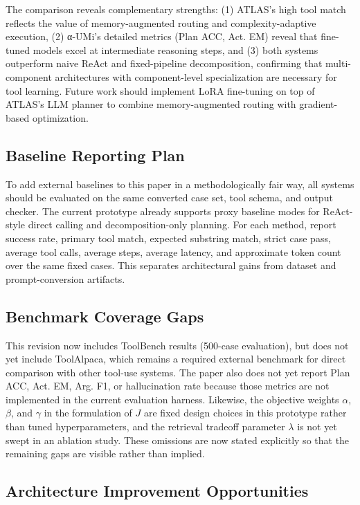 \documentclass[conference]{IEEEtran}
\begin{document}
The comparison reveals complementary strengths: (1) ATLAS's high tool match reflects the value of memory-augmented routing and complexity-adaptive execution, (2) α-UMi's detailed metrics (Plan ACC, Act. EM) reveal that fine-tuned models excel at intermediate reasoning steps, and (3) both systems outperform naive ReAct and fixed-pipeline decomposition, confirming that multi-component architectures with component-level specialization are necessary for tool learning. Future work should implement LoRA fine-tuning on top of ATLAS's LLM planner to combine memory-augmented routing with gradient-based optimization.

\subsection{Baseline Reporting Plan}

To add external baselines to this paper in a methodologically fair way, all systems should be evaluated on the same converted case set, tool schema, and output checker. The current prototype already supports proxy baseline modes for ReAct-style direct calling and decomposition-only planning. For each method, report success rate, primary tool match, expected substring match, strict case pass, average tool calls, average steps, average latency, and approximate token count over the same fixed cases. This separates architectural gains from dataset and prompt-conversion artifacts.

\subsection{Benchmark Coverage Gaps}

This revision now includes ToolBench results (500-case evaluation), but does not yet include ToolAlpaca, which remains a required external benchmark for direct comparison with other tool-use systems. The paper also does not yet report Plan ACC, Act. EM, Arg. F1, or hallucination rate because those metrics are not implemented in the current evaluation harness. Likewise, the objective weights $\alpha$, $\beta$, and $\gamma$ in the formulation of $J$ are fixed design choices in this prototype rather than tuned hyperparameters, and the retrieval tradeoff parameter $\lambda$ is not yet swept in an ablation study. These omissions are now stated explicitly so that the remaining gaps are visible rather than implied.

\subsection{Architecture Improvement Opportunities}
\end{document}
